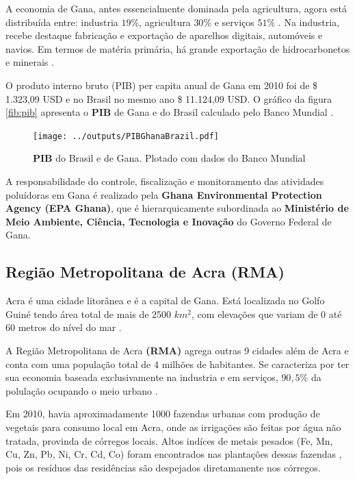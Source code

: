 A economia de Gana, antes essencialmente dominada pela agricultura, 
agora está distribuída entre: industria $19\%$, agricultura $30\%$ 
e serviços $51\%$ \citep{ghanacensus2013}.
Na industria, recebe destaque fabricação e exportação de aparelhos digitais, 
automóveis e navios. Em termos de matéria primária, há grande exportação de 
hidrocarbonetos e minerais \citep{ghanacensus2013}.

O produto interno bruto (PIB) per capita anual de Gana em 2010 foi
de \$ 1.323,09 USD e no Brasil no mesmo ano \$ 11.124,09 USD.
O gráfico da figura \ref{fib:pib} apresenta o \textbf{PIB} de Gana e do Brasil 
calculado pelo Banco Mundial \citep{bancomundial}.

\begin{figure}[H]
\begin{center}
  \texttt{[image: ../outputs/PIBGhanaBrazil.pdf]}
  \caption{\textbf{PIB} do Brasil e de Gana. Plotado com dados do 
           Banco Mundial \citep{bancomundial} \label{fig:pib}}
\end{center}
\end{figure}

A responsabilidade do controle, fiscalização e monitoramento das 
atividades poluídoras em Gana é realizado pela 
\textbf{Ghana Environmental Protection Agency (EPA Ghana)}, que é 
hierarquicamente subordinada ao 
\textbf{Ministério de Meio Ambiente, Ciência, Tecnologia e Inovação} do 
Governo Federal de Gana.

\subsection{Região Metropolitana de Acra \textbf{(RMA)}}

Acra é uma cidade litorânea e é a capital de Gana. Está localizada 
no Golfo Guiné tendo área total de mais de 2500 $km^2$, com elevações que 
variam de 0 até 60 metros do nível do mar \citep{ARKU2008}.

A Região Metropolitana de Acra \textbf{(RMA)} agrega outras 9 cidades
além de Acra e conta com uma população total de 4 milhões de habitantes. 
Se caracteriza por ter sua economia baseada exclusivamente na industria 
e em serviços, $90,5\%$ da polulação ocupando o meio urbano \citep{ghanacensus2013}.

Em 2010, havia aproximadamente 1000 fazendas urbanas com produção de vegetais 
para consumo local em Acra, onde as irrigações são feitas por água não tratada, 
provinda de córregos locais. Altos indíces de metais pesados 
(Fe, Mn, Cu, Zn, Pb, Ni, Cr, Cd, Co) foram encontrados nas plantações 
dessas fazendas \citep{lente2014}, pois os resíduos das residências são despejados 
diretamanente nos córregos.

